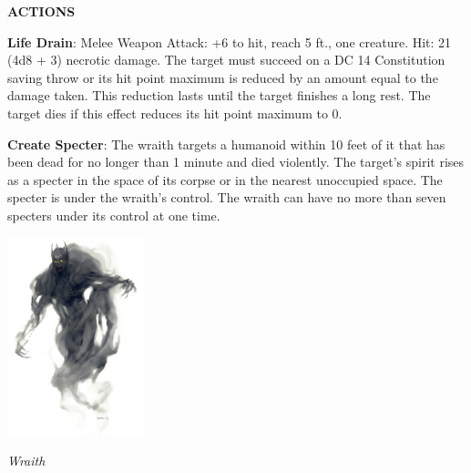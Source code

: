 \noindent\textbf{ACTIONS}

\noindent\textbf{Life Drain}:  Melee Weapon Attack: +6 to hit, reach 5 ft., one creature. Hit: 21 (4d8 + 3) necrotic damage. The target must succeed on a DC 14 Constitution saving throw or its hit point maximum is reduced by an amount equal to the damage taken. This reduction lasts until the target finishes a long rest. The target dies if this effect reduces its hit point maximum to 0.

\noindent\textbf{Create Specter}:  The wraith targets a humanoid within 10 feet of it that has been dead for no longer than 1 minute and died violently. The target's spirit rises as a specter in the space of its corpse or in the nearest unoccupied space. The specter is under the wraith's control. The wraith can have no more than seven specters under its control at one time.

\begin{center}
	\includegraphics[width = 0.3\textwidth]{wraith}
	
	\emph{Wraith}
\end{center}